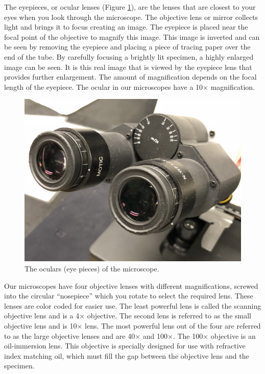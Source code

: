 The eyepieces, or ocular lenses (Figure \ref{fig:oculars}), are the lenses that are closest to your eyes when you look through the microscope. The objective lens or mirror collects light and brings it to focus creating an image. The eyepiece is placed near the focal point of the objective to magnify this image. This image is inverted and can be seen by removing the eyepiece and placing a piece of tracing paper over the end of the tube. By carefully focusing a brightly lit specimen, a highly enlarged image can be seen. It is this real image that is viewed by the eyepiece lens that provides further enlargement. The amount of magnification depends on the focal length of the eyepiece. The ocular in our microscopes have a 10× magnification.

\begin{figure}

{\centering \includegraphics[width=0.7\linewidth]{./figures/microscope/Oculars} 

}

\caption{The oculars (eye pieces) of the microscope.}\label{fig:oculars}
\end{figure}

Our microscopes have four objective lenses with different magnifications, screwed into the circular ``nosepiece'' which you rotate to select the required lens. These lenses are color coded for easier use. The least powerful lens is called the scanning objective lens and is a 4× objective. The second lens is referred to as the small objective lens and is 10× lens. The most powerful lens out of the four are referred to as the large objective lenses and are 40× and 100×. The 100× objective is an oil-immersion lens. This objective is specially designed for use with refractive index matching oil, which must fill the gap between the objective lens and the specimen.

